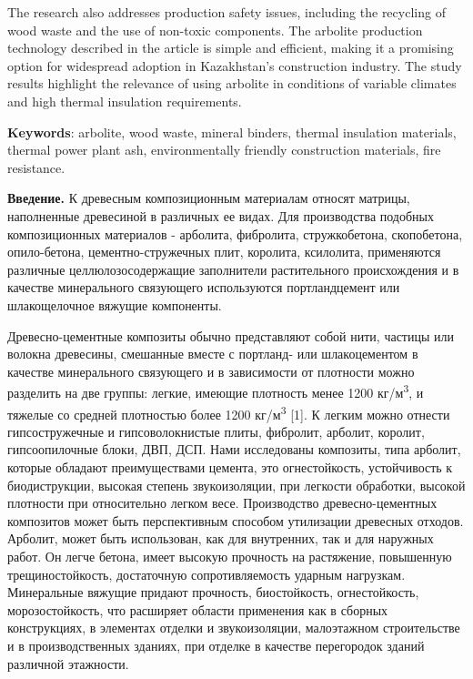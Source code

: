 The research also addresses production safety issues, including the
recycling of wood waste and the use of non-toxic components. The
arbolite production technology described in the article is simple and
efficient, making it a promising option for widespread adoption in
Kazakhstan's construction industry. The study results highlight the
relevance of using arbolite in conditions of variable climates and high
thermal insulation requirements.

{\bfseries Keywords}: arbolite, wood waste, mineral binders, thermal
insulation materials, thermal power plant ash, environmentally friendly
construction materials, fire resistance.

{\bfseries Введение.} К древесным композиционным материалам относят
матрицы, наполненные древесиной в различных ее видах. Для производства
подобных композиционных материалов - арболита, фибролита, стружкобетона,
скопобетона, опило-бетона, цементно-стружечных плит, королита,
ксилолита, применяются различные целлюлозосодержащие заполнители
растительного происхождения и в качестве минерального связующего
используются портландцемент или шлакощелочное вяжущие компоненты.

Древесно-цементные композиты обычно представляют собой нити, частицы или
волокна древесины, смешанные вместе с портланд- или шлакоцементом в
качестве минерального связующего и в зависимости от плотности можно
разделить на две группы: легкие, имеющие плотность менее 1200
кг/м\textsuperscript{3}, и тяжелые со средней плотностью более 1200
кг/м\textsuperscript{3} {[}1{]}. К легким можно отнести гипсостружечные
и гипсоволокнистые плиты, фибролит, арболит, королит, гипсоопилочные
блоки, ДВП, ДСП. Нами исследованы композиты, типа арболит, которые
обладают преимуществами цемента, это огнестойкость, устойчивость к
биодиструкции, высокая степень звукоизоляции, при легкости обработки,
высокой плотности при относительно легком весе. Производство
древесно-цементных композитов может быть перспективным способом
утилизации древесных отходов. Арболит, может быть использован, как для
внутренних, так и для наружных работ. Он легче бетона, имеет высокую
прочность на растяжение, повышенную трещиностойкость, достаточную
сопротивляемость ударным нагрузкам. Минеральные вяжущие придают
прочность, биостойкость, огнестойкость, морозостойкость, что расширяет
области применения как в сборных конструкциях, в элементах отделки и
звукоизоляции, малоэтажном строительстве и в производственных зданиях,
при отделке в качестве перегородок зданий различной этажности.

